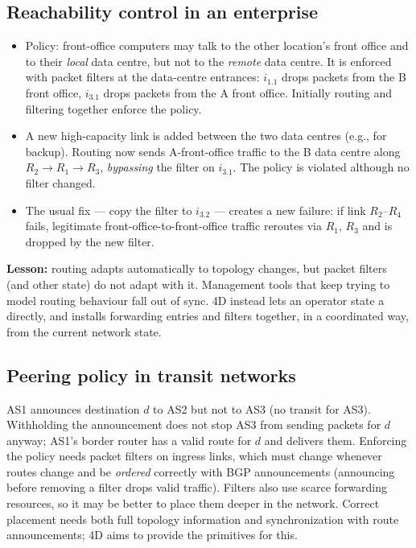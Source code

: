 \subsection{Reachability control in an enterprise}
\begin{itemize}
\item Policy: front-office computers may talk to the other location's front office and to their \emph{local} data centre, but not to the \emph{remote} data centre. It is enforced with packet filters at the data-centre entrances: $i_{1.1}$ drops packets from the B front office, $i_{3.1}$ drops packets from the A front office. Initially routing and filtering together enforce the policy.
\item A new high-capacity link is added between the two data centres (e.g., for backup). Routing now sends A-front-office traffic to the B data centre along $R_2\to R_1\to R_3$, \emph{bypassing} the filter on $i_{3.1}$. The policy is violated although no filter changed.
\item The usual fix --- copy the filter to $i_{3.2}$ --- creates a new failure: if link $R_2$--$R_4$ fails, legitimate front-office-to-front-office traffic reroutes via $R_1$, $R_3$ and is dropped by the new filter.
\end{itemize}
\textbf{Lesson:} routing adapts automatically to topology changes, but packet filters (and other state) do not adapt with it. Management tools that keep trying to model routing behaviour fall out of sync. 4D instead lets an operator state a  directly, and installs forwarding entries and filters together, in a coordinated way, from the current network state.

\subsection{Peering policy in transit networks}
AS1 announces destination $d$ to AS2 but not to AS3 (no transit for AS3). Withholding the announcement does not stop AS3 from sending packets for $d$ anyway; AS1's border router has a valid route for $d$ and delivers them. Enforcing the policy needs packet filters on ingress links, which must change whenever routes change and be \emph{ordered} correctly with BGP announcements (announcing before removing a filter drops valid traffic). Filters also use scarce forwarding resources, so it may be better to place them deeper in the network. Correct placement needs both full topology information and synchronization with route announcements; 4D aims to provide the primitives for this.

